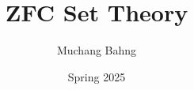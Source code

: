 \documentclass{article}
\begin{document}
\title{ZFC Set Theory}
\author{Muchang Bahng}
\date{Spring 2025}

\maketitle
\tableofcontents
\pagebreak









 
 


\end{document}
